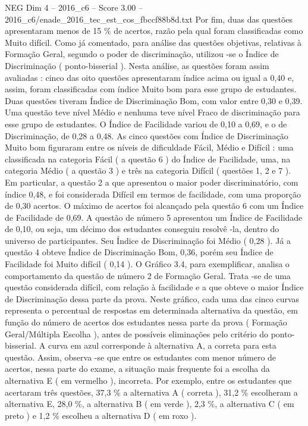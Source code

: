 \begin{textsample}{NEG Dim 4 – 2016\_c6 – Score 3.00 – 2016\_c6/enade\_2016\_tec\_est\_cos\_fbccf88b8d.txt}
Por fim, duas das questões apresentaram menos de 15 \% de acertos, razão pela qual foram classificadas como Muito difícil.
Como já comentado, para análise das questões objetivas, relativas à Formação Geral, segundo o poder de discriminação, utilizou -se o Índice de Discriminação ( ponto-bisserial ).
Nesta análise, as questões foram assim avaliadas : cinco das oito questões apresentaram índice acima ou igual a 0,40 e, assim, foram classificadas com índice Muito bom para esse grupo de estudantes.
Duas questões tiveram Índice de Discriminação Bom, com valor entre 0,30 e 0,39.
Uma questão teve nível Médio e nenhuma teve nível Fraco de discriminação para esse grupo de estudantes.
O Índice de Facilidade variou de 0,10 a 0,69, e o de Discriminação, de 0,28 a 0,48.
As cinco questões com Índice de Discriminação Muito bom figuraram entre os níveis de dificuldade Fácil, Médio e Difícil : uma classificada na categoria Fácil ( a questão 6 ) do Índice de Facilidade, uma, na categoria Médio ( a questão 3 ) e três na categoria Difícil ( questões 1, 2 e 7 ).
Em particular, a questão 2 a que apresentou o maior poder discriminatório, com índice 0,48, e foi considerada Difícil em termos de facilidade, com uma proporção de 0,30 acertos.
O máximo de acertos foi alcançado pela questão 6 com um Índice de Facilidade de 0,69.
A questão de número 5 apresentou um Índice de Facilidade de 0,10, ou seja, um décimo dos estudantes conseguiu resolvê -la, dentro do universo de participantes.
Seu Índice de Discriminação foi Médio ( 0,28 ).
Já a questão 4 obteve Índice de Discriminação Bom, 0,36, porém seu Índice de Facilidade foi Muito difícil ( 0,14 ).
O Gráfico 3.4, para exemplificar, analisa o comportamento da questão de número 2 de Formação Geral.
Trata -se de uma questão considerada difícil, com relação à facilidade e a que obteve o maior Índice de Discriminação dessa parte da prova.
Neste gráfico, cada uma das cinco curvas representa o percentual de respostas em determinada alternativa da questão, em função do número de acertos dos estudantes nessa parte da prova ( Formação Geral/Múltipla Escolha ), antes de possíveis eliminações pelo critério do ponto-bisserial.
A curva em azul corresponde à alternativa A, a correta para esta questão.
Assim, observa -se que entre os estudantes com menor número de acertos, nessa parte do exame, a situação mais frequente foi a escolha da alternativa E ( em vermelho ), incorreta.
Por exemplo, entre os estudantes que acertaram três questões, 37,3 \% a alternativa A ( correta ), 31,2 \% escolheram a alternativa E, 28,0 \%, a alternativa B ( em verde ), 2,3 \%, a alternativa C ( em preto ) e 1,2 \% escolheu a alternativa D ( em roxo ).

\end{textsample}
